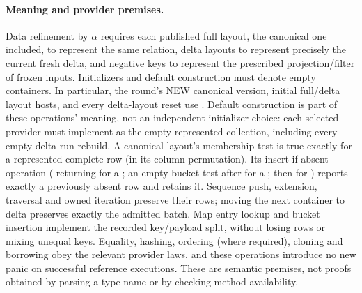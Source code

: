 \paragraph{Meaning and provider premises.} Data refinement by $\alpha$ requires
each published full layout, the canonical one included, to represent the same
relation, delta layouts to represent precisely the current fresh delta,
and negative keys to represent the prescribed projection/filter of frozen
inputs. Initializers and default construction must denote empty containers.
In particular, the round's NEW canonical version, initial full/delta layout
hosts, and every delta-layout reset use .
Default construction is part of these operations' meaning, not an independent
initializer choice: each selected provider must implement  as
the empty represented collection, including every empty delta-run rebuild.
A canonical layout's membership test is true exactly for a represented complete
row (in its column permutation). Its insert-if-absent operation (
returning  for a ; an empty-bucket test after
 for a ;  then  for
) reports exactly a previously absent row and retains it.
Sequence push, extension, traversal and owned iteration
preserve their rows; moving the next container to delta preserves exactly the
admitted batch. Map entry lookup and bucket insertion implement the recorded
key/payload split, without losing rows or mixing unequal keys. Equality,
hashing, ordering (where required), cloning and borrowing obey the relevant
provider laws, and these operations introduce no new panic on successful
reference executions. These are semantic premises, not proofs obtained by
parsing a type name or by checking method availability.


